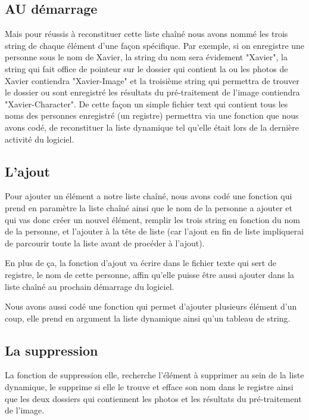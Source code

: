 \documentclass[12pt,a4paper]{article}
\begin{document}
\subsection{AU démarrage}

Mais pour réussis à reconstituer cette liste chaîné nous avons nommé les trois string de chaque élément d'une façon spécifique. Par exemple, si on enregistre une personne sous le nom de Xavier, la string du nom sera évidement "Xavier", la string qui fait office de pointeur sur le dossier qui contient la ou les photos de Xavier contiendra "Xavier-Image" et la troisième string qui permettra de trouver le dossier ou sont enregistré les résultats du pré-traitement de l'image contiendra "Xavier-Character". De cette façon un simple fichier text qui contient tous les noms des personnes enregistré (un registre) permettra via une fonction que nous avons codé, de reconstituer la liste dynamique tel qu'elle était lors de la dernière activité du logiciel. 

\subsection{L'ajout}

Pour ajouter un élément a notre liste chaîné, nous avons codé une fonction qui prend en paramètre la liste chaîné ainsi que le nom de la personne a ajouter et qui vas donc créer un nouvel élément, remplir les trois string en fonction du nom de la personne, et l'ajouter à la tête de liste (car l'ajout en fin de liste impliquerai de parcourir toute la liste avant de procéder à l'ajout). 


En plus de ça, la fonction d'ajout va écrire dans le fichier texte qui sert de registre, le nom de cette personne, affin qu'elle puisse être aussi ajouter dans la liste chaîné au prochain démarrage du logiciel.


Nous avons aussi codé une fonction qui permet d'ajouter plusieurs élément d'un coup, elle prend en argument la liste dynamique ainsi qu'un tableau de string.

\subsection{La suppression}

La fonction de suppression elle, recherche l’élément à supprimer au sein de la liste dynamique, le supprime si elle le trouve et efface son nom dans le registre ainsi que les deux dossiers qui contiennent les photos et les résultats du pré-traitement de l'image.
\end{document}
